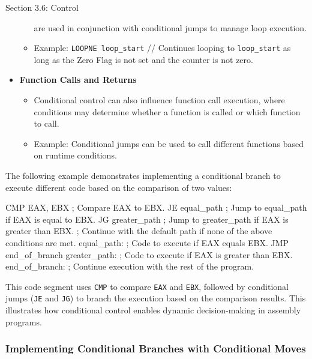 \begin{notes}{Section 3.6: Control}
\begin{itemize}
\begin{itemize}
            are used in conjunction with conditional jumps to manage loop execution.
            \item Example: \texttt{LOOPNE loop\_start} // Continues looping to \texttt{loop\_start} as long as the Zero Flag is not set and the counter is not zero.
        \end{itemize}
        \item \textbf{Function Calls and Returns}
        \begin{itemize}
            \item Conditional control can also influence function call execution, where conditions may determine whether a function is called or which function to call.
            \item Example: Conditional jumps can be used to call different functions based on runtime conditions.
        \end{itemize}
    \end{itemize}
    
    \begin{highlight}
        The following example demonstrates implementing a conditional branch to execute different code based on the comparison of two values:
    
    \begin{code}[Assembly]
    CMP EAX, EBX           ; Compare EAX to EBX.
    JE equal_path          ; Jump to equal_path if EAX is equal to EBX.
    JG greater_path        ; Jump to greater_path if EAX is greater than EBX.
    ; Continue with the default path if none of the above conditions are met.
    equal_path:
        ; Code to execute if EAX equals EBX.
        JMP end_of_branch
    greater_path:
        ; Code to execute if EAX is greater than EBX.
    end_of_branch:
        ; Continue execution with the rest of the program.
    \end{code}
    
        This code segment uses \texttt{CMP} to compare \texttt{EAX} and \texttt{EBX}, followed by conditional jumps (\texttt{JE} and \texttt{JG}) to branch the execution based on the comparison results. 
        This illustrates how conditional control enables dynamic decision-making in assembly programs.
    \end{highlight}

    \subsubsection*{Implementing Conditional Branches with Conditional Moves}


\end{notes}
